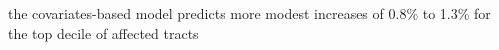 the covariates-based model predicts more modest increases of 0.8\% to 1.3\% for the top decile of affected tracts%
